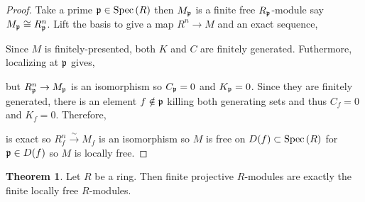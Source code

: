 \documentclass[12pt]{extarticle}
\theoremstyle{definition}
\newtheorem{theorem}{Theorem}[section]
\begin{document}
\begin{proof}
Take a prime $\mathfrak{p} \in \mathrm{Spec}\left(R\right)$ then $M_{\mathfrak{p}}$ is a finite free $R_{\mathfrak{p}}$-module say $M_{\mathfrak{p}} \cong R_{\mathfrak{p}}^n$. Lift the basis to give a map $R^n \to M$ and an exact sequence,
\begin{center}
\end{center}
Since $M$ is finitely-presented, both $K$ and $C$ are finitely generated. Futhermore, localizing at $\mathfrak{p}$ gives,
\begin{center}
\end{center}
but $R^n_{\mathfrak{p}} \to M_{\mathfrak{p}}$ is an isomorphism so $C_{\mathfrak{p}} = 0$ and $K_{\mathfrak{p}} = 0$. Since they are finitely generated, there is an element $f \notin \mathfrak{p}$ killing both generating sets and thus $C_f = 0$ and $K_f = 0$. Therefore, 
\begin{center}
\end{center}
is exact so $R^n_f \xrightarrow{\sim} M_f$ is an isomorphism so $M$ is free on $D(f) \subset \mathrm{Spec}\left(R\right)$ for $\mathfrak{p} \in D(f)$ so $M$ is locally free.
\end{proof}

\begin{theorem}
Let $R$ be a ring. Then finite projective $R$-modules are exactly the finite locally free $R$-modules. 
\end{theorem}
\end{document}
